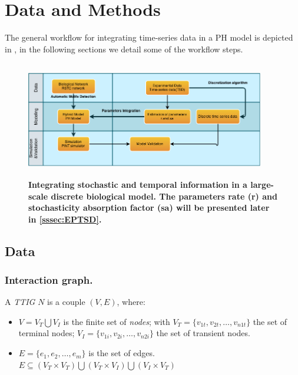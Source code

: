 
\section{Data and Methods}

The general workflow for integrating time-series data in a PH model is depicted in , in the following sections we 
detail some of the workflow steps.
\begin{figure}[H]
 \centering
 \includegraphics[width=4.1in,height=2in]{images/workflow-2.png}
\caption{{\bf Integrating stochastic and temporal information in a large-scale discrete biological model. The parameters rate (r) and stochasticity absorption factor (sa)  
will be presented later in \ref{sssec:EPTSD}.}} 
 \label{fig:workflow}
\end{figure}


\subsection{Data}

\subsubsection{Interaction graph.}
\label{ssec:RSTC}


\begin{definition} \label{def:RSTCDef}
A \emph{TTIG} $N$ is a couple $(V,E)$, where:
\begin{itemize}
\item $V =V_{T} \bigcup V_{I} $ is the finite set of \emph{nodes};
 with 
  $V_{T} = \{v_{1t},v_{2t}, \dots ,v_{n1t} \} $ the set of terminal nodes;
  $V_{I} = \{v_{1i},v_{2i}, \dots ,v_{n2i} \} $ the set of transient nodes.
\item $E = \{e_{1},e_{2}, \dots, e_{m} \}$ is the set of edges. $ E \subseteq (V_{T} \times V_{T}) \bigcup (V_{T} \times V_{I}) 
\bigcup (V_{I} \times V_{T})$
\end{itemize}
\end{definition}

